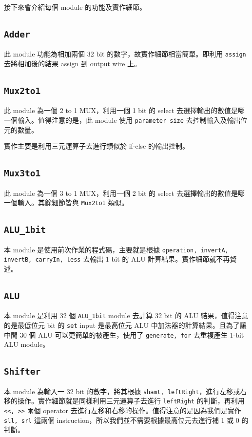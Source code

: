 \documentclass[twocolumn]{extarticle}
\begin{document}
接下來會介紹每個 module 的功能及實作細節。

\subsection{\texttt{Adder}}

此 module 功能為相加兩個 32 bit 的數字，故實作細節相當簡單。即利用 \texttt{assign} 去將相加後的結果 assign 到 output wire 上。

\subsection{\texttt{Mux2to1}}

此 module 為一個 2 to 1 MUX，利用一個 1 bit 的 select 去選擇輸出的數值是哪一個輸入。值得注意的是，此 module 使用 \texttt{parameter size} 去控制輸入及輸出位元的數量。 

實作主要是利用三元運算子去進行類似於 if-else 的輸出控制。

\subsection{\texttt{Mux3to1}}

此 module 為一個 3 to 1 MUX，利用一個 2 bit 的 select 去選擇輸出的數值是哪一個輸入。其餘細節皆與 \texttt{Mux2to1} 類似。

\subsection{\texttt{ALU\_1bit}}

本 module 是使用前次作業的程式碼，主要就是根據 \texttt{operation, invertA, invertB, carryIn, less} 去輸出 1 bit 的 ALU 計算結果。實作細節就不再贅述。

\subsection{\texttt{ALU}}

本 module 是利用 32 個 \texttt{ALU\_1bit} module 去計算 32 bit 的 ALU 結果，值得注意的是最低位元 bit 的 \texttt{set} input 是最高位元 ALU 中加法器的計算結果。且為了讓中間 30 個 ALU 可以更簡單的被產生，使用了 \texttt{generate, for} 去重複產生 1-bit ALU module。

\subsection{\texttt{Shifter}}

本 module 為輸入一 32 bit 的數字，將其根據 \texttt{shamt, leftRight}，進行左移或右移的操作。實作細節就是同樣利用三元運算子去進行 \texttt{leftRight} 的判斷，再利用 \texttt{<<, >>} 兩個 operator 去進行左移和右移的操作。值得注意的是因為我們是實作 \texttt{sll, srl} 這兩個 instruction，所以我們並不需要根據最高位元去進行補 1 或 0 的判斷。
\end{document}
